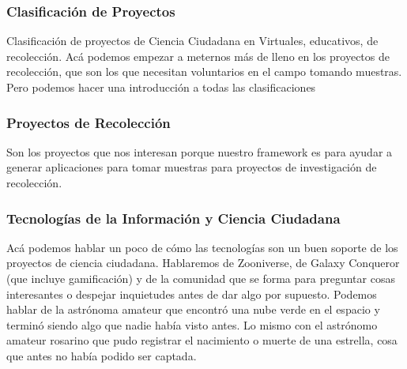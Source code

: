 \subsubsection{Clasificación de Proyectos}	 
Clasificación de proyectos de Ciencia Ciudadana en Virtuales, educativos, de recolección. Acá podemos empezar a meternos más de lleno en los proyectos de recolección, que son los que necesitan voluntarios en el campo tomando muestras. Pero podemos hacer una introducción a todas las clasificaciones

\subsubsection{Proyectos de Recolección}	 
Son los proyectos que nos interesan porque nuestro framework es para ayudar a generar aplicaciones para tomar muestras para proyectos de investigación de recolección. 

\subsubsection{Tecnologías de la Información y Ciencia Ciudadana}	 
Acá podemos hablar un poco de cómo las tecnologías son un buen soporte de los proyectos de ciencia ciudadana. Hablaremos de Zooniverse, de Galaxy Conqueror (que incluye gamificación) y de la comunidad que se forma para preguntar cosas interesantes o despejar inquietudes antes de dar algo por supuesto. Podemos hablar de la astrónoma amateur que encontró una nube verde en el espacio y terminó siendo algo que nadie había visto antes. Lo mismo con el astrónomo amateur rosarino que pudo registrar el nacimiento o muerte de una estrella, cosa que antes no había podido ser captada.

